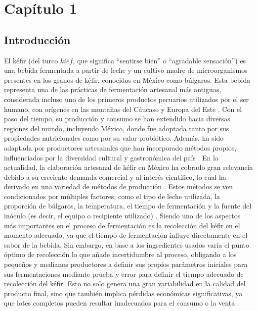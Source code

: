 \section{Capítulo 1}
\subsection{Introducción}
El kéfir (del turco $kief$, que significa ``sentirse bien'' o ``agradable sensación'') es una
bebida fermentada a partir de leche y un cultivo madre de microorganismos
presentes en los granos de kéfir, conocidos en México como búlgaros. Esta bebida
representa una de las prácticas de fermentación artesanal más antiguas,
considerada incluso uno de los primeros productos pecuarios utilizados por el ser
humano, con orígenes en las montañas del Cáucaso y Europa del Este \cite{KumarBehera2017} \cite{LucianaGabriela;2019}.
Con el paso del tiempo, su producción y consumo se han extendido hacia diversas
regiones del mundo, incluyendo México, donde fue adoptada tanto por sus
propiedades nutricionales como por su valor probiótico. Además, ha sido adaptada
por productores artesanales que han incorporado métodos propios, influenciados
por la diversidad cultural y gastronómica del país \cite{CamachoVera2019}  \cite{CesarOjeda2021}.\newline
En la actualidad, la elaboración artesanal de kéfir en México ha cobrado gran
relevancia debido a su creciente demanda comercial y al interés científico, lo cual
ha derivado en una variedad de métodos de producción \cite{MauroCadme2021}. Estos métodos se ven
condicionados por múltiples factores, como el tipo de leche utilizada, la proporción
de búlgaros, la temperatura, el tiempo de fermentación y la fuente del inóculo (es
decir, el equipo o recipiente utilizado) \cite{LopezRuiz2023}.\newline
Siendo uno de los aspectos más importantes en el proceso de fermentación es la
recolección del kéfir en el momento adecuado, ya que el tiempo de fermentación
influye directamente en el sabor de la bebida. Sin embargo, en base a los
ingredientes usados varía el punto óptimo de recolección lo que añade
incertidumbre al proceso, obligando a los pequeños y medianos productores a
definir sus propios parámetros iniciales para sus fermentaciones mediante prueba y
error para definir el tiempo adecuado de recolección del kéfir. Esto no solo genera
una gran variabilidad en la calidad del producto final, sino que también implica
pérdidas económicas significativas, ya que lotes completos pueden resultar
inadecuados para el consumo o la venta \cite{RuedaManzano1980}.\newline
